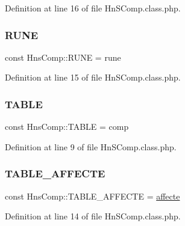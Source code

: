 Definition at line 16 of file Hn\+S\+Comp.\+class.\+php.

\mbox{\label{class_hns_comp_adab1aea651031ad061dcf1574aedf99b}} 
\subsubsection{\texorpdfstring{R\+U\+NE}{RUNE}}
{\footnotesize\ttfamily const Hns\+Comp\+::\+R\+U\+NE = \textquotesingle{}rune\textquotesingle{}}



Definition at line 15 of file Hn\+S\+Comp.\+class.\+php.

\mbox{\label{class_hns_comp_a7257da3d475aeacccfbf2205336e58f1}} 
\subsubsection{\texorpdfstring{T\+A\+B\+LE}{TABLE}}
{\footnotesize\ttfamily const Hns\+Comp\+::\+T\+A\+B\+LE = \textquotesingle{}comp\textquotesingle{}}



Definition at line 9 of file Hn\+S\+Comp.\+class.\+php.

\mbox{\label{class_hns_comp_a969f657a681a5b17fda2716a9cca7899}} 
\subsubsection{\texorpdfstring{T\+A\+B\+L\+E\+\_\+\+A\+F\+F\+E\+C\+TE}{TABLE\_AFFECTE}}
{\footnotesize\ttfamily const Hns\+Comp\+::\+T\+A\+B\+L\+E\+\_\+\+A\+F\+F\+E\+C\+TE = \textquotesingle{}\hyperlink{class_hns_comp_adc2876b97085870a3e10bdc3fa9931a5}{affecte}\textquotesingle{}}



Definition at line 14 of file Hn\+S\+Comp.\+class.\+php.

\mbox{\label{class_hns_comp_a33f98d7efe34a5600cb32126dd695785}} 
